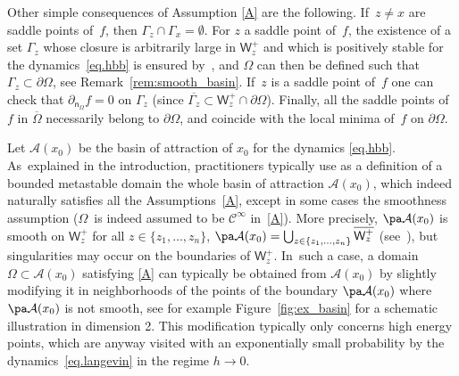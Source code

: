 Other simple consequences of Assumption \ref{A} are the following. If~$z\neq x$ are saddle
points of~$f$, then $\Gamma_z\cap \Gamma_x=\emptyset$. For $z$ a
saddle point of~$f$, the existence of a set $\Gamma_z$ whose
closure is arbitrarily large in $\mathsf W_z^+$ and which is
positively stable for the dynamics~\eqref{eq.hbb} is ensured
by~\cite[Prop.\,80]{DLLN}, and $\Omega$ can then be defined such
that $\Gamma_z \subset \partial \Omega$, see Remark~\ref{rem:smooth_basin}. If~$z$ is a saddle point of~$f$ one can check that
$\partial_{\mathsf n_\Omega} f=0\text{ on } \Gamma_z$ (since $\overline{\Gamma_z}\subset \mathsf W_z^+\cap \partial \Omega$).
Finally, all the saddle points of~$f$ in
$\overline{\Omega}$ necessarily belong to $\partial \Omega$, and
coincide with the local minima of~$f$ on $\partial \Omega$.

\begin{remark}\label{rem:smooth_basin} Let $\mathcal A(x_0)$ be the basin of attraction of $x_0$ for the
dynamics \eqref{eq.hbb}. As~explained in the
introduction, practitioners typically use as a definition
of a bounded metastable domain the whole basin of attraction $\mathcal
A(x_0)$, which indeed naturally satisfies all the Assumptions~\ref{A},
except in some cases the smoothness assumption ($\Omega$~is indeed assumed
to be $\mathcal C^\infty$ in~\ref{A}). More precisely, $\pa \mathcal A(x_0)$ is
smooth on $\mathsf W_z^+$ for all $z \in
\{z_1,\ldots,z_n\}$, $\pa \mathcal A(x_0)=\bigcup_{z \in
\{z_1,\ldots,z_n\}} \overline{\mathsf W_z^+}$ (see~\cite[Th.\,B.13]{menz-schlichting-14}), but singularities may occur on the
boundaries of $\mathsf W_z^+$. In~such a case, a domain $\Omega \subset \mathcal
A(x_0)$ satisfying \ref{A} can typically be obtained from $\mathcal
A(x_0)$ by slightly modifying it in neighborhoods
of the points of the boundary $\pa \mathcal A(x_0)$ where $\pa \mathcal
A(x_0)$ is not smooth, see for example Figure~\ref{fig:ex_basin} for
a schematic illustration in dimension 2. This modification typically only
concerns high energy points, which are anyway visited with an
exponentially small probability by the dynamics~\eqref{eq.langevin}
in the regime $h \to 0$.

\begin{figure}
\begin{center}
\end{center}
\end{figure}
\end{remark}

